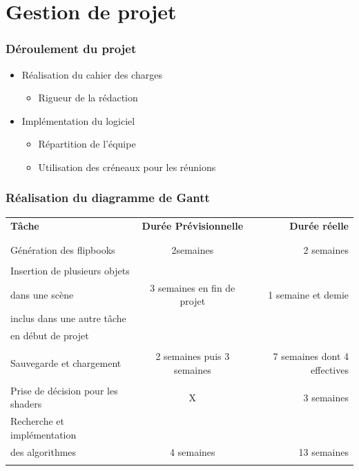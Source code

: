 \documentclass{beamer}
\begin{document}
\section{Gestion de projet}

\begin{frame}
\frametitle{Déroulement du projet}
\begin{itemize}[label=$\bullet$]
\item Réalisation du cahier des charges
	\begin{itemize}[label=$\circ$]
	\item Rigueur de la rédaction
	\end{itemize}
\item Implémentation du logiciel
	\begin{itemize}[label=$\circ$]
	\item Répartition de l'équipe
	\item Utilisation des créneaux pour les réunions
	\end{itemize}
\end{itemize}

\end{frame}


\begin{frame}
\frametitle{Réalisation du diagramme de Gantt}
{\fontsize{7}{8}\selectfont
{}
\begin{tabular}{lcr}

\textbf{Tâche} & \textbf{Durée Prévisionnelle} & \textbf{Durée réelle} \\
\\
\hline
\\
Génération des flipbooks & 2semaines & 2 semaines \\
\hline
\\
Insertion de plusieurs objets \\ dans une scène &
3 semaines en fin de projet & 
1 semaine et demie \\ inclus dans 
une autre tâche \\ en début de projet \\
\hline
\\
Sauvegarde et chargement & 2 semaines puis 3 semaines &
7 semaines dont 4 effectives \\
\hline
\\
Prise de décision pour les shaders & X & 3 semaines\\
Recherche et implémentation \\des algorithmes &
4 semaines & 13 semaines \\
\hline
\\

\end{tabular}
}

\end{frame}
\end{document}
